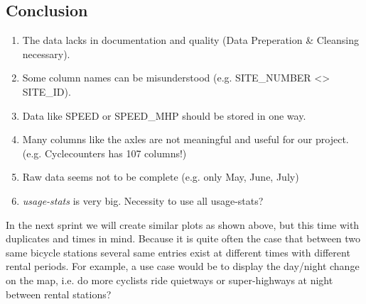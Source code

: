 \subsection{Conclusion}
\begin{enumerate}
\item The data lacks in documentation and quality (Data Preperation \& Cleansing necessary).
\item Some column names can be misunderstood (e.g. SITE\_NUMBER <> SITE\_ID).
\item Data like SPEED or SPEED\_MHP should be stored in one way.
\item Many columns like the axles are not meaningful and useful for our project. (e.g. Cyclecounters
has 107 columns!)
\item Raw data seems not to be complete (e.g. only May, June, July)
\item \emph{usage-stats} is very big. Necessity to use all usage-stats?
\end{enumerate}
In the next sprint we will create similar plots as shown above, but this time with duplicates and times in mind. Because it is quite often the case that between two same bicycle stations several same entries exist at different times with different rental periods. For example, a use case would be to display the day/night change on the map,
i.e. do more cyclists ride quietways or super-highways at night between rental stations?
